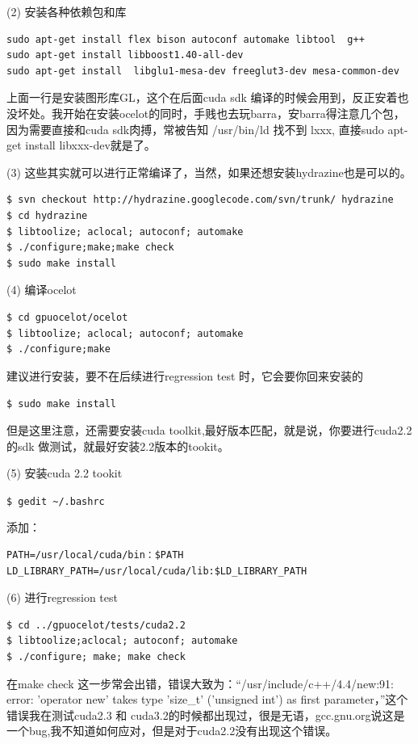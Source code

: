 (2) 安装各种依赖包和库
\begin{verbatim}
sudo apt-get install flex bison autoconf automake libtool  g++
sudo apt-get install libboost1.40-all-dev
sudo apt-get install  libglu1-mesa-dev freeglut3-dev mesa-common-dev 
\end{verbatim}

上面一行是安装图形库GL，这个在后面cuda sdk 编译的时候会用到，反正安着也没坏处。我开始在安装ocelot的同时，手贱也去玩barra，安barra得注意几个包，因为需要直接和cuda sdk肉搏，常被告知 /usr/bin/ld 找不到 lxxx, 直接sudo apt-get install libxxx-dev就是了。

(3) 这些其实就可以进行正常编译了，当然，如果还想安装hydrazine也是可以的。
\begin{verbatim}
$ svn checkout http://hydrazine.googlecode.com/svn/trunk/ hydrazine
$ cd hydrazine
$ libtoolize; aclocal; autoconf; automake
$ ./configure;make;make check
$ sudo make install
\end{verbatim}

(4) 编译ocelot
\begin{verbatim}
$ cd gpuocelot/ocelot
$ libtoolize; aclocal; autoconf; automake
$ ./configure;make
\end{verbatim}

建议进行安装，要不在后续进行regression test 时，它会要你回来安装的

\verb"$ sudo make install"

但是这里注意，还需要安装cuda toolkit,最好版本匹配，就是说，你要进行cuda2.2的sdk 做测试，就最好安装2.2版本的tookit。

(5) 安装cuda 2.2 tookit

\verb"$ gedit ~/.bashrc"

添加：
\begin{verbatim}
PATH=/usr/local/cuda/bin：$PATH
LD_LIBRARY_PATH=/usr/local/cuda/lib:$LD_LIBRARY_PATH
\end{verbatim}

(6) 进行regression test
\begin{verbatim}
$ cd ../gpuocelot/tests/cuda2.2
$ libtoolize;aclocal; autoconf; automake
$ ./configure; make; make check
\end{verbatim}

在make check 这一步常会出错，错误大致为：“/usr/include/c++/4.4/new:91: error: 'operator new' takes type 'size\_t' ('unsigned int') as first parameter，”这个错误我在测试cuda2.3 和 cuda3.2的时候都出现过，很是无语，gcc.gnu.org说这是一个bug,我不知道如何应对，但是对于cuda2.2没有出现这个错误。

